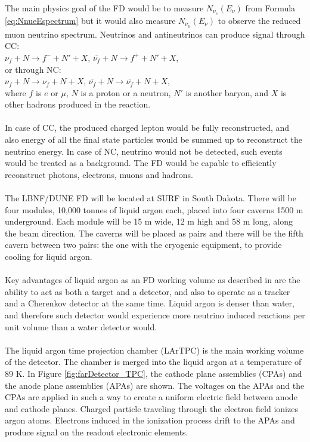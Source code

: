 The main physics goal of the FD would be to measure $N_{\nu_e}(E_{\nu})$  from Formula \ref{eq:NnueEspectrum} but it would also measure $N_{\nu_\mu}(E_{\nu})$ to observe the reduced muon neutrino spectrum. Neutrinos and antineutrinos can produce signal through CC:\\
$\nu_f+N \rightarrow f^- + N' +X$, $\bar{\nu_f}+N \rightarrow f^+ + N' +X$,\\
or through NC:\\
$\nu_f+N \rightarrow \nu_f + N +X$, $\bar{\nu_f}+N \rightarrow \bar{\nu_f} + N +X$,\\
where $f$ is $e$ or $\mu$, $N$ is a proton or a neutron, $N'$ is another baryon, and $X$ is other hadrons produced in the reaction.\\ \\
In case of CC, the produced charged lepton would be fully reconstructed, and also energy of all the final state particles would be summed up to reconstruct the neutrino energy. In case of NC, neutrino would not be detected, such events would be treated as a background.
The FD would be capable to efficiently reconstruct photons, electrons, muons and hadrons. \\ \\
The LBNF/DUNE FD will be located at SURF in South Dakota. There will be four modules, 10,000 tonnes of liquid argon each, placed into four caverns 1500 m underground. Each module will be 15 m wide, 12 m high and 58 m long, along the beam direction. The caverns will be placed as pairs and there will be the fifth cavern between two pairs: the one with the cryogenic equipment, to provide cooling for liquid argon.\\ \\
Key advantages of liquid argon as an FD working volume as described in \cite{ref_aboutLAr} are the ability to act as both a target and a detector, and also to operate as a tracker and a Cherenkov detector at the same time. Liquid argon is denser than water, and therefore such detector would experience more neutrino induced reactions per unit volume than a water detector would. \\ \\
The liquid argon time projection chamber (LArTPC) is the main working volume of the detector. The chamber is merged into the liquid argon at a temperature of 89 K. In Figure \ref{fig:farDetector_TPC}, the cathode plane assemblies (CPAs) and the anode plane assemblies (APAs) are shown. The voltages on the APAs and the CPAs are applied in such a way to create a uniform electric field between anode and cathode planes. Charged particle traveling through the electron field ionizes argon atoms. Electrons induced in the ionization process drift to the APAs and produce signal on the readout electronic elements.\\ \\
